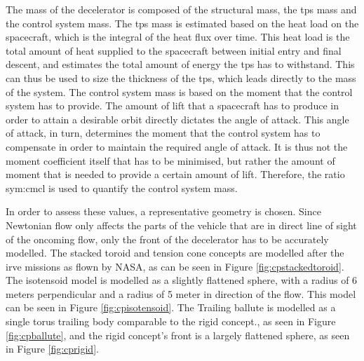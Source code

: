 The mass of the decelerator is composed of the structural mass, the \gls{tps} mass and the control system mass. 
The \gls{tps} mass is estimated based on the heat load on the spacecraft, which is the integral of the heat flux over time. This heat load is the total amount of heat supplied to the spacecraft between initial entry and final descent, and estimates the total amount of energy the \gls{tps} has to withstand. This can thus be used to size the thickness of the \gls{tps}, which leads directly to the mass of the system.
The control system mass is based on the moment that the control system has to provide. The amount of lift that a spacecraft has to produce in order to attain a desirable orbit directly dictates the angle of attack. This angle of attack, in turn, determines the moment that the control system has to compensate in order to maintain the required angle of attack. It is thus not the moment coefficient itself that has to be minimised, but rather the amount of moment that is needed to provide a certain amount of lift. Therefore, the ratio \gls{sym:cmcl} is used to quantify the control system mass.

In order to assess these values, a representative geometry is chosen. Since Newtonian flow only affects the parts of the vehicle that are in direct line of sight of the oncoming flow, only the front of the decelerator has to be accurately modelled. The stacked toroid and tension cone concepts are modelled after the \gls{irve} missions as flown by NASA, as can be seen in Figure \ref{fig:cpstackedtoroid}. The isotensoid model is modelled as a slightly flattened sphere, with a radius of 6 meters perpendicular and a radius of 5 meter in direction of the flow. This model can be seen in Figure \ref{fig:cpisotensoid}. The Trailing ballute is modelled as a single torus trailing body comparable to the rigid concept., as seen in Figure \ref{fig:cpballute}, and the rigid concept's front is a largely flattened sphere, as seen in Figure \ref{fig:cprigid}.



